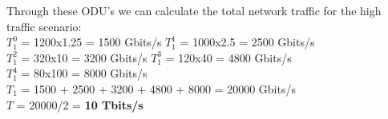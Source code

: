 \vspace{17pt}
Through these ODU's we can calculate the total network traffic for the high traffic scenario:\\

$T_1^0$ = 1200x1.25 = 1500 Gbits/s \qquad
$T_1^1$ = 1000x2.5 = 2500 Gbits/s \\

$T_1^2$ = 320x10 = 3200 Gbits/s \qquad
$T_1^3$ = 120x40 = 4800 Gbits/s \\

$T_1^4$ = 80x100 = 8000 Gbits/s \\

$T_{1}$ = 1500 + 2500 + 3200 + 4800 + 8000 = 20000 Gbits/s \\

$T$ = 20000/2 = \textbf{10 Tbits/s}\\

